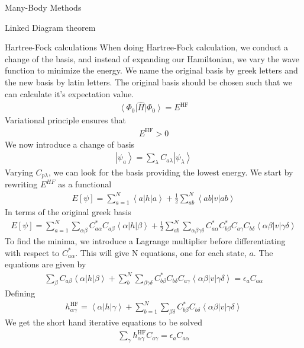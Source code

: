 \documentclass[twoside,english]{uiofysmaster}
\begin{document}
\begin{chapter}{Many-Body Methods}
\begin{section}{Linked Diagram theorem}
	\end{section}

	\begin{section}{Hartree-Fock calculations}
 		When doing Hartree-Fock calculation, we conduct a change of the basis, and instead of expanding our Hamiltonian, we vary the wave function to minimize the energy. We name the original basis by greek letters and the new basis by latin letters. The original basis should be chosen such that we can calculate it's expectation value. 
 		\begin{align}
 			\left< \Phi_0 \right| \hat H \left| \Phi_0 \right> = E^{\text{HF}}
 		\end{align}
 		Variational principle ensures that 
 		\begin{align}
 			E^{\text{HF}} > 0 
 		\end{align}
 		We now introduce a change of basis 
 		\begin{align}
 			\left| \psi_a \right> = \sum_{\lambda} C_{a\lambda} \left| \psi_{\lambda} \right>
 		\end{align}
 		Varying $C_{p\lambda}$, we can look for the basis providing the lowest energy. We start by rewriting $E^{HF}$ as a functional
 		\begin{align}
 			E\left[ \psi \right] = \sum_{a=1}^N \left< a \right| h \left| a \right> + \frac{1}{2} \sum_{ab}^N \left< ab \right| v \left| ab \right>
  		\end{align}
  		In terms of the original greek basis
  		\begin{align}
  			E\left[ \psi \right] = \sum_{a=1}^N \sum_{\alpha \beta} C_{a \alpha}^* C_{a \beta} \left< \alpha \right| h \left| \beta \right> + \frac{1}{2} \sum_{ab}^N \sum_{\alpha \beta \gamma \delta} C_{a \alpha}^* C_{b \beta}^* C_{a \gamma} C_{b \delta} \left< \alpha \beta \right| v \left| \gamma \delta \right>
  		\end{align}
  		To find the minima, we introduce a Lagrange multiplier before differentiating with respect to $C_{a  \alpha}^*$. This will give N equations, one for each state, $a$. The equations are given by
  		\begin{align}
  			\sum_{\beta} C_{a \beta} \left< \alpha \right| h \left| \beta \right> + \sum_b^N \sum_{\beta \gamma \delta} C_{b \beta}^* C_{b \delta} C_{a \gamma} \left< \alpha \beta \right| v \left| \gamma \delta \right> = \epsilon_a C_{a \alpha}
  		\end{align}
  		Defining
  		\begin{align}
  			h_{\alpha \gamma}^{\text{HF}} = \left< \alpha \right| h \left| \gamma \right> + \sum_{b=1}^N \sum_{\beta \delta} C_{b \beta}^* C_{b \delta} \left< \alpha \beta \right| v \left| \gamma \delta \right> 
  		\end{align}
  		We get the short hand iterative equations to be solved 
  		\begin{align}
  			\sum_{\gamma} h_{\alpha \gamma}^{\text{HF}} C_{a \gamma} = \epsilon_{a} C_{a \alpha}
  		\end{align}
 	\end{section}

\end{chapter}
\end{document}
